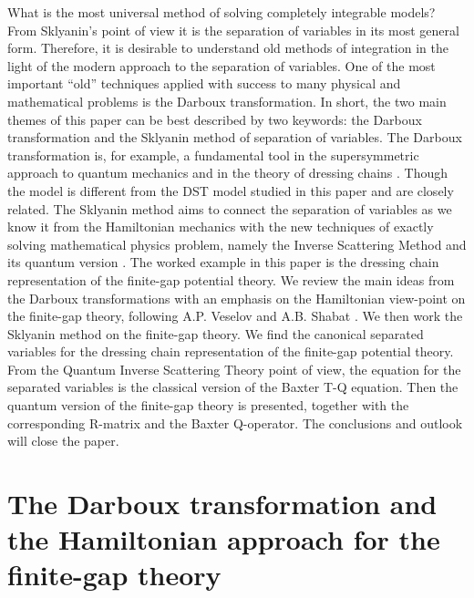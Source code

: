\documentclass[a4paper,11pt]{article}
\begin{document}
What is the most universal method of solving completely integrable models? From
Sklyanin's point of view \cite{Sklyanin1} it is the separation of variables in its
most general form. Therefore, it is desirable to understand old methods of
integration in the light of the modern approach to the separation of variables. One
of the most important ``old'' techniques applied with success to many physical and
mathematical problems is the Darboux transformation. In short, the two main themes
of this paper can be best described by two keywords: the Darboux transformation and
the Sklyanin method of separation of variables. The Darboux transformation is, for
example, a fundamental tool in the supersymmetric approach to quantum mechanics and
in the theory of dressing chains \cite{Veselov,Cooper}. Though the model is
different from the DST model studied in \cite{Sky} this paper and \cite{Sky} are
closely related. The Sklyanin method aims to connect the separation of variables as
we know it from the Hamiltonian mechanics with the new techniques of exactly solving
mathematical physics problem, namely the Inverse Scattering Method and its quantum
version \cite{Kuz}. The worked example in this paper is the dressing chain
representation of the finite-gap potential theory. We review the main ideas from the
Darboux transformations with an emphasis on the Hamiltonian view-point on the
finite-gap theory, following A.P. Veselov and A.B. Shabat \cite{Veselov}. We then
work the Sklyanin method \cite{Sklyanin1,Sklyanin2,Sklyanin3} on the finite-gap
theory. We find the canonical separated variables for the dressing chain
representation of the finite-gap potential theory. From the Quantum Inverse
Scattering Theory point of view, the equation for the separated variables is the
classical version of the Baxter T-Q equation. Then the quantum version of the
finite-gap theory is presented, together with the corresponding R-matrix and the
Baxter Q-operator. The conclusions and outlook will close the paper.

 \section{The Darboux transformation and the Hamiltonian approach for the
 finite-gap theory}
\end{document}
